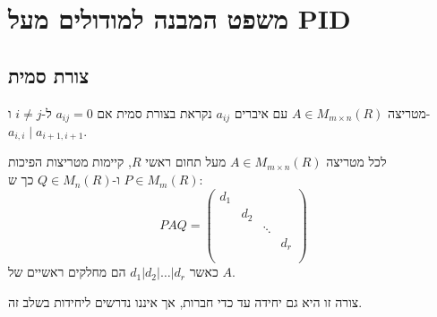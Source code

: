 \documentclass{tstextbook}
\begin{document}
\chapter{משפט המבנה למודולים מעל PID}

\section{צורת סמית}

\begin{definition}
מטריצה \(A \in M_{m \times n}(R)\) עם איברים \(a_{ij}\) נקראת בצורת סמית אם \(a_{ij}=0\) ל-\(i\neq j\) ו-\(a_{i,i}\mid a_{i+1,i+1}\).

\end{definition}
\begin{proposition}
לכל מטריצה \(A \in M_{m \times n}(R)\) מעל תחום ראשי \(R\), קיימות מטריצות הפיכות \(P \in M_{m}(R)\) ו-\(Q \in M_{n}(R)\) כך ש:
$$PAQ = \begin{pmatrix}d_{1} & & & \\& d_{2} & & \\& & \ddots & \\& & & d_{r} \\& & & \\
\end{pmatrix}$$
כאשר \(d_{1} | d_{2} | \dots | d_{r}\) הם מחלקים ראשיים של \(A\).

\end{proposition}
\begin{remark}
צורה זו היא גם יחידה עד כדי חברות, אך איננו נדרשים ליחידות בשלב זה.

\end{remark}
\end{document}

